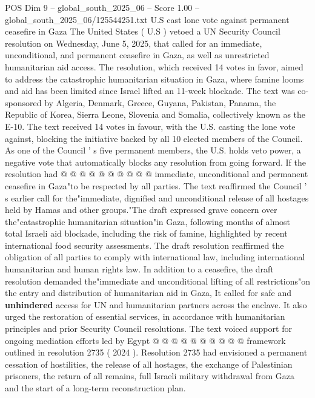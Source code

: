 \begin{textsample}{POS Dim 9 – global\_south\_2025\_06 – Score 1.00 – global\_south\_2025\_06/125544251.txt}  \label{ex:f9_pos_176}
U.S cast lone vote against permanent ceasefire in Gaza The United States ( U.S ) vetoed a UN Security Council resolution on Wednesday, June 5, 2025, that called for an immediate, unconditional, and permanent ceasefire in Gaza, as well as unrestricted humanitarian aid access.
The resolution, which received 14 votes in favor, aimed to address the catastrophic humanitarian situation in Gaza, where famine looms and aid has been limited since Israel lifted an 11-week blockade.
The text was co-sponsored by Algeria, Denmark, Greece, Guyana, Pakistan, Panama, the Republic of Korea, Sierra Leone, Slovenia and Somalia, collectively known as the E-10.
The text received 14 votes in favour, with the U.S. casting the lone vote against, blocking the initiative backed by all 10 elected members of the Council.
As one of the Council ' s five permanent members, the U.S. holds veto power, a negative vote that automatically blocks any resolution from going forward.
If the resolution had @ @ @ @ @ @ @ @ @ @ immediate, unconditional and permanent ceasefire in Gaza"to be respected by all parties.
The text reaffirmed the Council ' s earlier call for the"immediate, dignified and unconditional release of all hostages held by Hamas and other groups."The draft expressed grave concern over the"catastrophic humanitarian situation"in Gaza, following months of almost total Israeli aid blockade, including the risk of famine, highlighted by recent international food security assessments.
The draft resolution reaffirmed the obligation of all parties to comply with international law, including international humanitarian and human rights law.
In addition to a ceasefire, the draft resolution demanded the"immediate and unconditional lifting of all restrictions"on the entry and distribution of humanitarian aid in Gaza, It called for safe and \textbf{unhindered} access for UN and humanitarian partners across the enclave.
It also urged the restoration of essential services, in accordance with humanitarian principles and prior Security Council resolutions.
The text voiced support for ongoing mediation efforts led by Egypt @ @ @ @ @ @ @ @ @ @ framework outlined in resolution 2735 ( 2024 ).
Resolution 2735 had envisioned a permanent cessation of hostilities, the release of all hostages, the exchange of Palestinian prisoners, the return of all remains, full Israeli military withdrawal from Gaza and the start of a long-term reconstruction plan.

\end{textsample}
